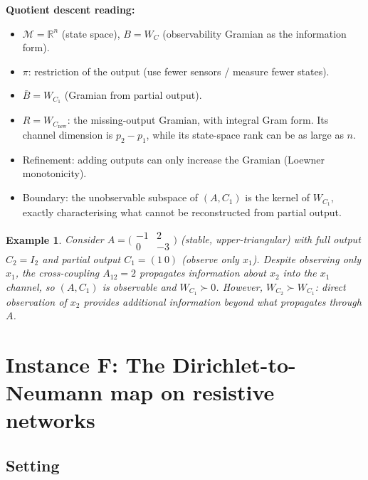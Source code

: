 \documentclass[11pt,a4paper]{article}
\numberwithin{equation}{section}
\newcommand{\R}{\mathbb{R}}
\theoremstyle{thmcompact}
\newtheorem{example}[theorem]{Example}
\theoremstyle{remark}
\begin{document}
\textbf{Quotient descent reading:}
\begin{itemize}[leftmargin=2em]
\item $\mathcal{M} = \R^n$ (state space), $B = W_C$ (observability Gramian as the information form).
\item $\pi$: restriction of the output (use fewer sensors / measure fewer states).
\item $\bar{B} = W_{C_1}$ (Gramian from partial output).
\item $R = W_{C_{\mathrm{new}}}$: the missing-output Gramian, with integral Gram form. Its channel dimension is $p_2 - p_1$, while its state-space rank can be as large as $n$.
\item Refinement: adding outputs can only increase the Gramian (Loewner monotonicity).
\item Boundary: the unobservable subspace of $(A, C_1)$ is the kernel of $W_{C_1}$, exactly characterising what cannot be reconstructed from partial output.
\end{itemize}

\begin{example}
Consider $A = \bigl(\begin{smallmatrix} -1 & 2 \\ 0 & -3 \end{smallmatrix}\bigr)$ (stable, upper-triangular) with full output $C_2 = I_2$ and partial output $C_1 = (1\ 0)$ (observe only $x_1$). Despite observing only $x_1$, the cross-coupling $A_{12} = 2$ propagates information about $x_2$ into the $x_1$ channel, so $(A, C_1)$ is observable and $W_{C_1} \succ 0$. However, $W_{C_2} \succ W_{C_1}$: direct observation of $x_2$ provides additional information beyond what propagates through $A$.
\end{example}

\section{Instance F: The Dirichlet-to-Neumann map on resistive networks}
\label{sec:bridge-F}

\subsection{Setting}
\end{document}
